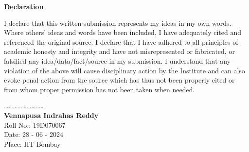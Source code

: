 \documentclass[12pt, a4paper, twoside, openright]{Thesis} %
\newcommand\myemptypage{
    \null
    \thispagestyle{empty}
    \addtocounter{page}{-1}
    \newpage
    }
\begin{document}
{\clearpage %




{ %

\centerline{\textbf{\LARGE {Declaration}}}}
\vspace{3em}
I declare that this written submission represents my ideas in my own words. Where others' ideas and words have been included, I have adequately cited and referenced the original source. I declare that I have adhered to all principles of academic honesty and integrity and have not misrepresented or fabricated, or falsified any idea/data/fact/source in my submission. I understand that any violation of the above will cause disciplinary action by the Institute and can also evoke penal action from the source which has thus not been properly cited or from whom proper permission has not been taken when needed.

\bigskip
\bigskip
\bigskip
\bigskip

\begin{flushleft}
\ldots \ldots \ldots \ldots \ldots \ldots \ldots \ldots \ldots\\
\vspace{2mm}
\textbf{Vennapusa Indrahas Reddy} \\
Roll No.: 19D070067 \\
Date: 28 - 06 - 2024 \\
Place: IIT Bombay
\end{flushleft}

\clearpage %






}
\end{document}
